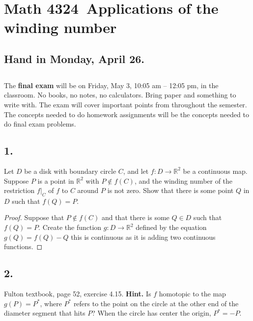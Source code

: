 \documentclass{amsart}
\theoremstyle{plain}
\theoremstyle{definition}
\theoremstyle{remark}
\begin{document}
\section*{Math 4324\  Applications of the winding number} 

\subsection*{Hand in Monday, April 26.} 

\vspace{.25in}
\subsection*{} The {\bf final exam} will be on Friday, May 3, 10:05 am -- 12:05 pm, in the classroom. No books, no notes, no calculators. Bring paper and something to write with. The exam will cover important points from throughout the semester. The concepts needed to do homework assignments will be the concepts needed to do  final exam problems. 

\vspace{.25in}
\noindent
\subsection*{1.} Let $D$ be  a disk with boundary circle $C$, and let $f: D\to \mathbb{R}^2$ be a continuous map. Suppose $P$ is a point in $\mathbb{R}^2$ with $P\not \in f(C)$, and the winding number of the restriction $f|_C$ of $f$ to $C$ around $P$ is not zero. Show that there is some point $Q$ in $D$ such that $f(Q) = P$.

\begin{proof}
    Suppose that $P\not \in f(C)$ and that there is some $Q\in D$ such that $f(Q)=P$. Create the function $g: D\to \mathbb{R}^2 $ defined by the equation $g(Q)=f(Q)-Q$ this is continuous as it is adding two continuous functions. 
\end{proof}

\vspace{.15in}
\noindent
\subsection*{2.} Fulton textbook, page 52, exercise 4.15. {\bf  Hint.} Is $f$ homotopic to the map $g(P) = P^*$, where $P^*$ refers to the point on the circle at the other end of the diameter segment that hits $P$? When the circle has center the origin, $P^* = -P$. 
\end{document}
